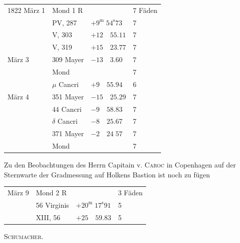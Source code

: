 \begin{center}
\begin{tabular}{l|l|l|l}
1822 März 1 & Mond 1 R & & 7 Fäden \\
 & PV, 287 & $+9^{\mathrm{m}}\;54^{\mathrm{s}}73$ & 7 \\
 & V, 303 & $+12\quad55.11$ & 7 \\
 & V, 319 & $+15\quad23.77$ & 7 \\
März 3 & 309 Mayer & $-13\quad3.60$ & 7 \\
 & Mond & & 7 \\
 & $\mu$ Cancri & $+9\quad55.94$ & 6 \\
März 4 & 351 Mayer & $-15\quad25.29$ & 7 \\
 & 44 Cancri & $-9\quad58.83$ & 7 \\
 & $\delta$ Cancri & $-8\quad25.67$ & 7 \\
 & 371 Mayer & $-2\quad24\;57$ & 7 \\
 & Mond & & 7 \\
\end{tabular}
\end{center}

Zu den Beobachtungen des Herrn Capitain v. \textsc{Caroc} in Copenhagen auf der Sternwarte der Gradmessung auf Holkens Bastion ist noch zu fügen

\begin{center}
\begin{tabular}{l|l|l|l}
März 9 & Mond 2 R & & 3 Fäden \\
 & 56 Virginis & $+20^{\mathrm{m}}\;17^{\mathrm{s}}91$ & 5 \\
 & XIII, 56 & $+25\quad59.83$ & 5 \\
\end{tabular}
\end{center}

\begin{flushright}
\textsc{Schumacher}.
\end{flushright}
